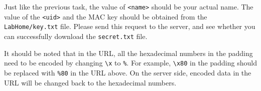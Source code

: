 Just like the previous task, the value of \texttt{<name>} should be your actual name.
The value of the \texttt{<uid>} and the MAC key should be
obtained from the \texttt{LabHome/key.txt} file.
Please send this request to the server, and see whether you can
successfully download the \texttt{secret.txt} file.

It should be noted that in the URL,
all the hexadecimal numbers in the padding
need to be encoded by changing
\texttt{\textbackslash x} to \texttt{\%}. For example,
\texttt{\textbackslash x80} in the padding should be
replaced with \texttt{\%80} in the URL above.
On the server side, encoded data in the URL
will be changed back to the hexadecimal numbers.
